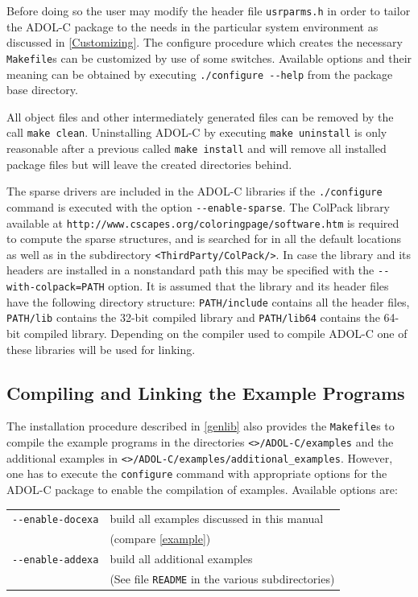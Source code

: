 \documentclass[11pt,twoside]{article}
\begin{document}
Before doing so the user may modify the header file \verb=usrparms.h=
in order to tailor the \mbox{ADOL-C} package to the needs in the
particular system environment as discussed in 
\autoref{Customizing}. The configure procedure which creates the necessary
\verb=Makefile=s can be customized by use of some switches. Available
options and their meaning can be obtained by executing
\verb=./configure --help= from the package base directory. 

All object files and other intermediately generated files can be
removed by the call \verb=make clean=. Uninstalling ADOL-C by
executing \verb=make uninstall= is only reasonable after a previous
called \verb=make install= and will remove all installed package files
but will leave the created directories behind. 

The sparse drivers are included in the ADOL-C libraries if the
\verb=./configure= command is executed with the option
\verb=--enable-sparse=. The ColPack library available at 
\verb=http://www.cscapes.org/coloringpage/software.htm= is required to
compute the sparse structures, and is searched for in all the default 
locations as well as in the subdirectory \verb=<ThirdParty/ColPack/>=.
In case the library and its headers are installed in a nonstandard path
this may be specified with the \verb?--with-colpack=PATH? option.
It is assumed that the library and its header files have the following
directory structure: \verb?PATH/include? contains all the header
files,
\verb?PATH/lib? contains the 32-bit compiled library and 
\verb?PATH/lib64? contains the 64-bit compiled library. Depending on
the compiler used to compile {\sf ADOL-C} one of these libraries will
be used for linking.
 
\subsection{Compiling and Linking the Example Programs}
%
The installation procedure described in \autoref{genlib} also
provides the \verb=Makefile=s  to compile the example programs in the
directories \verb=<=\texttt{\packagetar}\verb=>/ADOL-C/examples= and the
additional examples in
\verb=<=\texttt{\packagetar}\verb=>/ADOL-C/examples/additional_examples=. However,
one has to execute the 
\verb=configure= command with  appropriate options for the ADOL-C package to enable the compilation of
examples. Available options are: 
\begin{center}
\begin{tabular}[t]{ll}
\verb=--enable-docexa=&build all examples discussed in this manual\\
&(compare \autoref{example})\\
\verb=--enable-addexa=&build all additional examples\\
&(See file \verb=README= in the various subdirectories)
\end{tabular}
\end{center}
\end{document}

